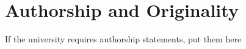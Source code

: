 \chapter{Authorship and Originality}

If the university requires authorship statements, put them here